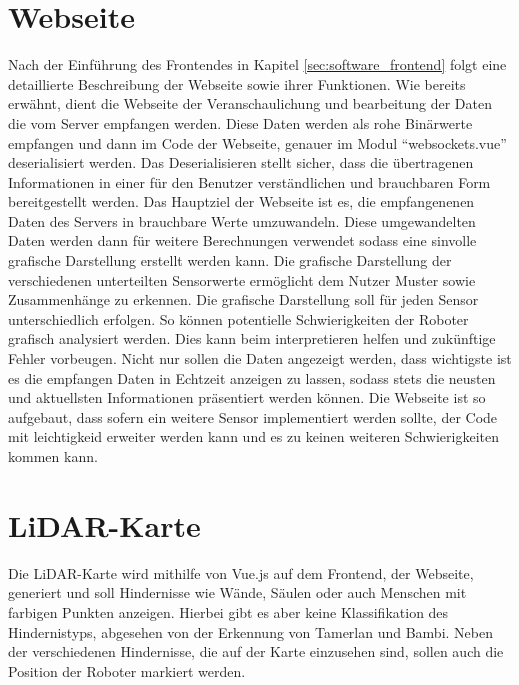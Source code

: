 \section{Webseite}
\label{subsec:frontend_Webseite}
Nach der Einführung des Frontendes in Kapitel \ref{sec:software_frontend} folgt eine detaillierte
Beschreibung der Webseite sowie ihrer Funktionen. 
%
Wie bereits erwähnt, dient die Webseite der Veranschaulichung 
und bearbeitung der Daten die vom Server empfangen werden. 
%
Diese Daten werden als rohe Binärwerte empfangen und dann im Code der Webseite,
genauer im Modul ``websockets.vue'' deserialisiert werden. 
Das Deserialisieren stellt sicher, dass die übertragenen Informationen in einer für den Benutzer 
verständlichen und brauchbaren Form bereitgestellt werden. 
%
Das Hauptziel der Webseite ist es, die empfangenenen Daten des Servers in brauchbare Werte umzuwandeln. 
Diese umgewandelten Daten werden dann für weitere Berechnungen verwendet sodass eine sinvolle grafische Darstellung
erstellt werden kann.
%
Die grafische Darstellung der verschiedenen unterteilten Sensorwerte ermöglicht dem Nutzer Muster sowie 
Zusammenhänge zu erkennen. 
%
Die grafische Darstellung soll für jeden Sensor unterschiedlich erfolgen. So können potentielle Schwierigkeiten 
der Roboter grafisch analysiert werden. Dies kann beim interpretieren helfen und zukünftige Fehler vorbeugen. 
%
Nicht nur sollen die Daten angezeigt werden, dass wichtigste ist es die empfangen Daten 
in Echtzeit anzeigen zu lassen, sodass stets die neusten und aktuellsten Informationen präsentiert werden können.
%
Die Webseite ist so aufgebaut, dass sofern ein weitere Sensor implementiert werden sollte, 
der Code mit leichtigkeid erweiter werden kann und es zu keinen weiteren Schwierigkeiten kommen kann.  

\section{LiDAR-Karte}
\label{subsec:frontend_lidar_map}
Die LiDAR-Karte wird mithilfe von Vue.js auf dem Frontend,
der Webseite,
generiert und soll Hindernisse wie Wände,
Säulen oder auch Menschen mit farbigen Punkten anzeigen.
%
Hierbei gibt es aber keine Klassifikation des Hindernistyps,
abgesehen von der Erkennung von Tamerlan und Bambi.
%
Neben der verschiedenen Hindernisse,
die auf der Karte einzusehen sind,
sollen auch die Position der Roboter markiert werden.

